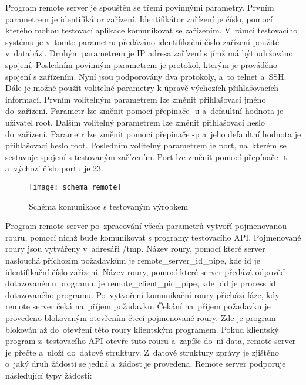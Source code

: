 Program remote server je spouštěn se třemi povinnými parametry. Prvním parametrem je identifikátor zařízení. Identifikátor zařízení je číslo, pomocí kterého mohou testovací aplikace komunikovat se zařízením. V~rámci testovacího systému je v~tomto parametru předáváno identifikační číslo zařízení použité v~databázi. Druhým parametrem je IP adresa zařízení s jímž má být udržováno spojení. Posledním povinným parametrem je protokol, kterým je prováděno spojení s zařízením. Nyní jsou podporovány dva protokoly, a~to telnet a~SSH. Dále je možné použít volitelné parametry k úpravě výchozích přihlašovacích informací. Prvním volitelným parametrem lze změnit přihlašovací jméno do~zařízení. Parametr lze změnit pomocí přepínače -u a~defaultní hodnota je uživatel root. Dalším volitelný parametrem lze změnit přihlašovací heslo do~zařízení. Parametr lze změnit pomocí přepínače -p a~jeho defaultní hodnota je přihlašovací heslo root. Posledním volitelný parametrem je port, na~kterém se sestavuje spojení s testovaným zařízením. Port lze změnit pomocí přepínače -t a~výchozí číslo portu je 23.


\begin{figure}[h]
  \centering
  \texttt{[image: schema\_remote]}
  \caption{Schéma komunikace s testovaným výrobkem}
  \label{fig:schema_remote}
\end{figure}

Program remote server po~zpracování všech parametrů vytvoří pojmenovanou rouru, pomocí nichž bude komunikovat s programy testovacího API. Pojmenované roury jsou vytvářeny v~adresáři /tmp. Název roury, pomocí které server naslouchá příchozím požadavkům je remote\_server\_id\_pipe, kde id je identifikační číslo zařízení. Název roury, pomocí které server předává odpověď dotazovanému programu, je remote\_client\_pid\_pipe, kde pid je process id dotazovaného programu. Po~vytvoření komunikační roury přichází fáze, kdy remote server čeká na~příjem požadavku. Čekání na~příjem požadavku je provedeno blokovaným otevřením čtecí pojmenované roury. Zde je program blokován až do~otevření této roury klientským programem. Pokud klientský program z~testovacího API otevře tuto rouru a~zapíše do~ní data, remote server je přečte a~uloží do~datové struktury. Z~datové struktury zprávy je zjištěno o~jaký druh žádosti se jedná a~žádost je provedena. Remote server podporuje následující typy žádosti:

